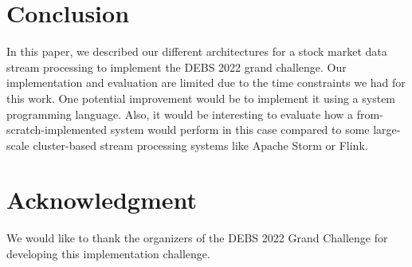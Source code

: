 \documentclass[sigconf]{acmart}
\begin{document}



\maketitle








\section{Conclusion}\label{sec:conclustion}
In this paper, we described our different architectures for a stock market data stream processing to implement the DEBS 2022 grand challenge. Our implementation and evaluation are limited due to the time constraints we had for this work. One potential improvement would be to implement it using a system programming language. Also, it would be interesting to evaluate how a from-scratch-implemented system would perform in this case compared to some large-scale cluster-based stream processing systems like Apache Storm or Flink.

\section{Acknowledgment}
We would like to thank the organizers of the DEBS 2022 Grand Challenge for developing this implementation challenge.




\end{document}
